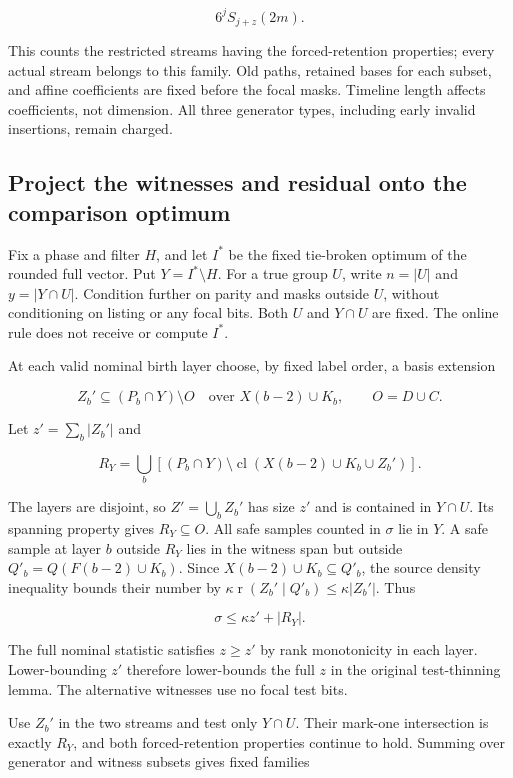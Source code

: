 \documentclass[11pt]{article}
\begin{document}
\[6^jS_{j+z}(2m).\]

This counts the restricted streams having the forced-retention properties; every actual stream belongs to this family. Old paths, retained bases for each subset, and affine coefficients are fixed before the focal masks. Timeline length affects coefficients, not dimension. All three generator types, including early invalid insertions, remain charged.

\subsection{Project the witnesses and residual onto the comparison optimum}\label{project-the-witnesses-and-residual-onto-the-comparison-optimum}

Fix a phase and filter \(H\), and let \(I^*\) be the fixed tie-broken optimum of the rounded full vector. Put \(Y=I^*\setminus H\). For a true group \(U\), write \(n=|U|\) and \(y=|Y\cap U|\). Condition further on parity and masks outside \(U\), without conditioning on listing or any focal bits. Both \(U\) and \(Y\cap U\) are fixed. The online rule does not receive or compute \(I^*\).

At each valid nominal birth layer choose, by fixed label order, a basis extension

\[Z_b'\subseteq(P_b\cap Y)\setminus O
\quad\text{over }X(b-2)\cup K_b,\qquad O=D\cup C.\]

Let \(z'=\sum_b|Z_b'|\) and

\[R_Y=\bigcup_b\left[(P_b\cap Y)\setminus
\operatorname{cl}(X(b-2)\cup K_b\cup Z_b')\right].\]

The layers are disjoint, so \(Z'=\bigcup_bZ_b'\) has size \(z'\) and is contained in \(Y\cap U\). Its spanning property gives \(R_Y\subseteq O\). All safe samples counted in \(\sigma\) lie in \(Y\). A safe sample at layer \(b\) outside \(R_Y\) lies in the witness span but outside \(Q'_b=Q(F(b-2)\cup K_b)\). Since \(X(b-2)\cup K_b\subseteq Q'_b\), the source density inequality bounds their number by \(\kappa\operatorname{r}(Z_b'\mid Q'_b)\le\kappa|Z_b'|\). Thus

\[\sigma\le\kappa z'+|R_Y|.\]

The full nominal statistic satisfies \(z\ge z'\) by rank monotonicity in each layer. Lower-bounding \(z'\) therefore lower-bounds the full \(z\) in the original test-thinning lemma. The alternative witnesses use no focal test bits.

Use \(Z_b'\) in the two streams and test only \(Y\cap U\). Their mark-one intersection is exactly \(R_Y\), and both forced-retention properties continue to hold. Summing over generator and witness subsets gives fixed families
\end{document}
